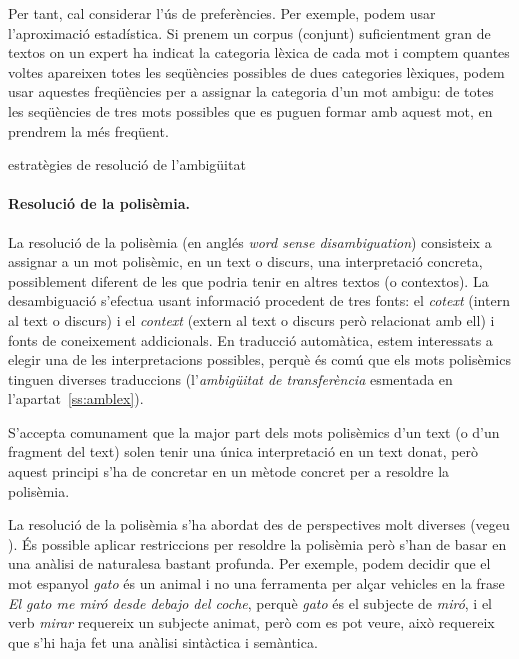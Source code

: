 Per tant, cal considerar l'ús de preferències. Per exemple, podem usar
l'aproximació estadística.  Si prenem un corpus (conjunt)
suficientment gran de textos on un expert ha indicat la categoria
lèxica de cada mot i comptem quantes voltes apareixen totes les
seqüències possibles de dues categories lèxiques, podem usar aquestes
freqüències per a assignar la categoria d'un mot ambigu: de totes les
seqüències de tres mots possibles que es puguen formar amb aquest mot,
en prendrem la més freqüent.

\begin{persabermes}{estratègies de resolució de l'ambigüitat}
\paragraph{Resolució de la polisèmia.}
La resolució de la polisèmia (en anglés \emph{word sense
  disambiguation}) consisteix a assignar a un mot polisèmic, en un
text o discurs, una interpretació concreta, possiblement diferent de
les que podria tenir en altres textos (o contextos). La desambiguació
s'efectua usant informació procedent de tres fonts: el \emph{cotext}
(intern al text o discurs) i el \emph{context} (extern al text o
discurs però relacionat amb ell) i fonts de coneixement addicionals.
En traducció automàtica, estem interessats a elegir una de les
interpretacions possibles, perquè és comú que els mots polisèmics
tinguen diverses traduccions (l'\emph{ambigüitat de transferència}
esmentada en l'apartat~\ref{ss:amblex}).

S'accepta comunament que la major part dels mots polisèmics d'un text
(o d'un fragment del text) solen tenir una única interpretació en un
text donat, però aquest principi s'ha de concretar en un mètode
concret per a resoldre la polisèmia.

La resolució de la polisèmia s'ha abordat des de perspectives molt
diverses (vegeu \citet{ide98j}).  És possible aplicar restriccions per
resoldre la polisèmia però s'han de basar en una anàlisi de naturalesa
bastant profunda. Per exemple, podem decidir que el mot espanyol
\emph{gato} és un animal i no una ferramenta per alçar vehicles en la
frase \emph{El gato me miró desde debajo del coche}, perquè
\emph{gato} és el subjecte de \emph{miró}, i el verb \emph{mirar}
requereix un subjecte animat, però com es pot veure, això requereix
que s'hi haja fet una anàlisi sintàctica i semàntica.
 

\end{persabermes}
